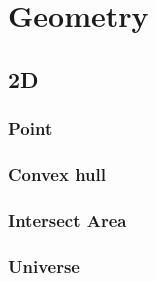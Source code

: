 \section{Geometry}

\subsection{2D}

\subsubsection{Point}


\subsubsection{Convex hull}


\subsubsection{Intersect Area}


\subsubsection{Universe}

